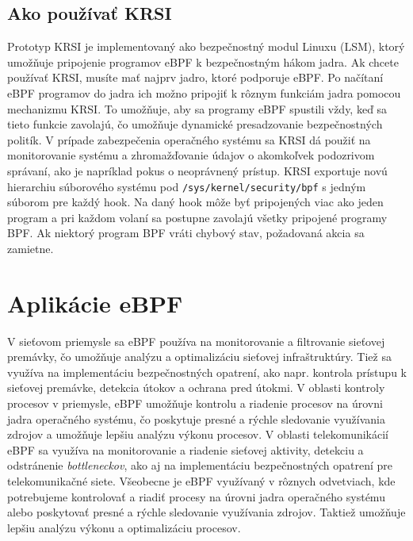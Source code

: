 \subsection*{Ako používať KRSI}
Prototyp KRSI je implementovaný ako bezpečnostný modul Linuxu (LSM), ktorý umožňuje pripojenie programov eBPF k bezpečnostným hákom jadra. 
Ak chcete používať KRSI, musíte mať najprv jadro, ktoré podporuje eBPF. Po načítaní eBPF programov do jadra ich možno pripojiť k rôznym 
funkciám jadra pomocou mechanizmu KRSI. To umožňuje, aby sa programy eBPF spustili vždy, keď sa tieto funkcie zavolajú, čo umožňuje dynamické 
presadzovanie bezpečnostných politík. V prípade zabezpečenia operačného systému sa KRSI dá použiť na monitorovanie systému a zhromažďovanie údajov 
o akomkoľvek podozrivom správaní, ako je napríklad pokus o neoprávnený prístup. KRSI exportuje novú hierarchiu súborového systému 
pod \texttt{/sys/kernel/security/bpf} s jedným súborom pre každý hook. Na daný hook môže byť pripojených viac ako jeden program a pri 
každom volaní sa postupne zavolajú všetky pripojené programy BPF. Ak niektorý program BPF vráti chybový stav, požadovaná akcia sa zamietne.

\section{Aplikácie eBPF}
V sieťovom priemysle sa eBPF používa na monitorovanie a filtrovanie sieťovej premávky, čo umožňuje analýzu a optimalizáciu sieťovej infraštruktúry. 
Tiež sa využíva na implementáciu bezpečnostných opatrení, ako napr. kontrola prístupu k sieťovej premávke, detekcia útokov a ochrana pred útokmi. 
V oblasti kontroly procesov v priemysle, eBPF umožňuje kontrolu a riadenie procesov na úrovni jadra operačného systému, čo poskytuje presné a rýchle sledovanie 
využívania zdrojov a umožňuje lepšiu analýzu výkonu procesov. V oblasti telekomunikácií eBPF sa využíva na monitorovanie a riadenie sieťovej aktivity, 
detekciu a odstránenie \emph{bottleneckov}, ako aj na implementáciu bezpečnostných opatrení pre telekomunikačné siete. Všeobecne je eBPF využívaný v rôznych odvetviach, 
kde potrebujeme kontrolovať a riadiť procesy na úrovni jadra operačného systému alebo poskytovať presné a rýchle sledovanie využívania zdrojov. Taktiež umožňuje lepšiu analýzu výkonu 
a optimalizáciu procesov.

